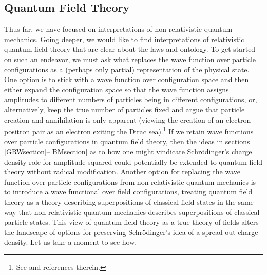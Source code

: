 \documentclass[12pt,onecolumn,secnumarabic,amsmath,amssymb,balancelastpage,nofootinbib]{article}
\begin{document}
\subsection{Quantum Field Theory}\label{QFT}

Thus far, we have focused on interpretations of non-relativistic quantum mechanics.  Going deeper, we would like to find interpretations of relativistic quantum field theory that are clear about the laws and ontology.  To get started on such an endeavor, we must ask what replaces the wave function over particle configurations as a (perhaps only partial) representation of the physical state.  One option is to stick with a wave function over configuration space and then either expand the configuration space so that the wave function assigns amplitudes to different numbers of particles being in different configurations, or, alternatively, keep the true number of particles fixed and argue that particle creation and annihilation is only apparent (viewing the creation of an electron-positron pair as an electron exiting the Dirac sea).\footnote{See \cite{struyve2011, tumulka2018, durr2020} and references therein.}  If we retain wave functions over particle configurations in quantum field theory, then the ideas in sections \ref{GRWsection}--\ref{BMsection} as to how one might vindicate Schr\"{o}dinger's charge density role for amplitude-squared could potentially be extended to quantum field theory without radical modification.  Another option for replacing the wave function over particle configurations from non-relativistic quantum mechanics is to introduce a wave functional over field configurations, treating quantum field theory as a theory describing superpositions of classical field states in the same way that non-relativistic quantum mechanics describes superpositions of classical particle states.  This view of quantum field theory as a true theory of fields alters the landscape of options for preserving Schr\"{o}dinger's idea of a spread-out charge density.  Let us take a moment to see how.
\end{document}
